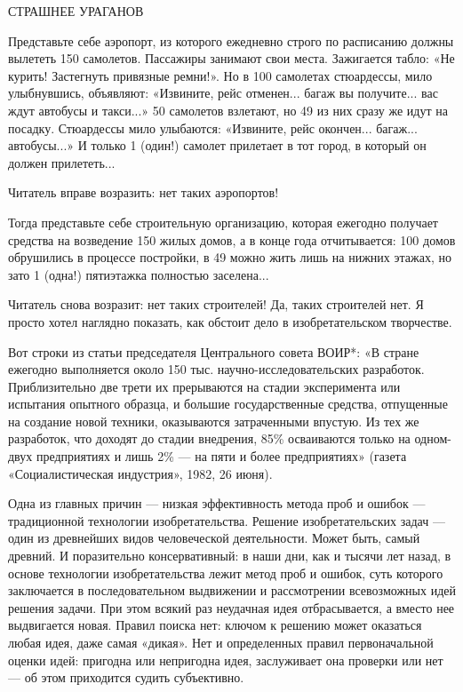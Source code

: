 СТРАШНЕЕ УРАГАНОВ

Представьте себе аэропорт, из  которого ежедневно строго по расписанию
должны  вылететь   150  самолетов.  Пассажиры  занимают   свои  места.
Зажигается табло: «Не  курить! Застегнуть привязные ремни!».  Но в 100
самолетах  стюардессы, мило  улыбнувшись,  объявляют: «Извините,  рейс
отменен...  багаж вы  получите...  вас ждут  автобусы  и такси...»  50
самолетов взлетают, но 49 из них  сразу же идут на посадку. Стюардессы
мило  улыбаются: «Извините,  рейс окончен...  багаж... автобусы...»  И
только 1  (один!) самолет прилетает в  тот город, в который  он должен
прилететь...

Читатель вправе возразить: нет таких аэропортов!

Тогда  представьте  себе  строительную организацию,  которая  ежегодно
получает  средства на  возведение  150  жилых домов,  а  в конце  года
отчитывается: 100  домов обрушились в  процессе постройки, в  49 можно
жить лишь  на нижних  этажах, но зато  1 (одна!)  пятиэтажка полностью
заселена...

Читатель снова  возразит: нет  таких строителей! Да,  таких строителей
нет.  Я   просто  хотел   наглядно  показать,   как  обстоит   дело  в
изобретательском творчестве.

Вот  строки  из  статьи  председателя Центрального  совета  ВОИР*:  «В
стране  ежегодно выполняется  около 150  тыс. научно-исследовательских
разработок.  Приблизительно   две  трети  их  прерываются   на  стадии
эксперимента или испытания опытного образца, и большие государственные
средства,   отпущенные   на   создание  новой   техники,   оказываются
затраченными  впустую. Из  тех же  разработок, что  доходят до  стадии
внедрения, 85\% осваиваются только на одном-двух предприятиях и лишь 2\%
— на пяти и  более предприятиях» (газета «Социалистическая индустрия»,
1982, 26 июня).

Одна из главных  причин — низкая эффективность метода проб  и ошибок —
традиционной  технологии  изобретательства.  Решение  изобретательских
задач  — один  из  древнейших видов  человеческой деятельности.  Может
быть, самый древний. И поразительно  консервативный: в наши дни, как и
тысячи  лет назад,  в основе  технологии изобретательства  лежит метод
проб и ошибок, суть которого заключается в последовательном выдвижении
и рассмотрении всевозможных  идей решения задачи. При  этом всякий раз
неудачная идея  отбрасывается, а вместо нее  выдвигается новая. Правил
поиска  нет:  ключом  к  решению  может  оказаться  любая  идея,  даже
самая «дикая».  Нет и определенных правил  первоначальной оценки идей:
пригодна или  непригодна идея, заслуживает  она проверки или нет  — об
этом приходится судить субъективно.

